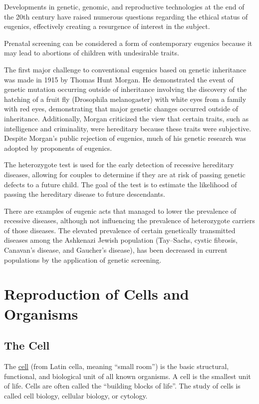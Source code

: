 Developments in genetic, genomic, and reproductive technologies at the end of the 20th century have raised numerous questions regarding the ethical status of eugenics, effectively creating a resurgence of interest in the subject.

Prenatal screening can be considered a form of contemporary eugenics because it may lead to abortions of children with undesirable traits.

The first major challenge to conventional eugenics based on genetic inheritance was made in 1915 by Thomas Hunt Morgan. He demonstrated the event of genetic mutation occurring outside of inheritance involving the discovery of the hatching of a fruit fly (Drosophila melanogaster) with white eyes from a family with red eyes, demonstrating that major genetic changes occurred outside of inheritance. Additionally, Morgan criticized the view that certain traits, such as intelligence and criminality, were hereditary because these traits were subjective. Despite Morgan's public rejection of eugenics, much of his genetic research was adopted by proponents of eugenics.

The heterozygote test is used for the early detection of recessive hereditary diseases, allowing for couples to determine if they are at risk of passing genetic defects to a future child. The goal of the test is to estimate the likelihood of passing the hereditary disease to future descendants.

There are examples of eugenic acts that managed to lower the prevalence of recessive diseases, although not influencing the prevalence of heterozygote carriers of those diseases. The elevated prevalence of certain genetically transmitted diseases among the Ashkenazi Jewish population (Tay--Sachs, cystic fibrosis, Canavan's disease, and Gaucher's disease), has been decreased in current populations by the application of genetic screening.

\hypertarget{reproduction-of-cells-and-organisms}{%
\chapter{Reproduction of Cells and Organisms}\label{reproduction-of-cells-and-organisms}}

\hypertarget{the-cell}{%
\section{The Cell}\label{the-cell}}

The \href{https://en.wikipedia.org/wiki/Cell_(biology)}{cell} (from Latin cella, meaning ``small room'') is the basic structural, functional, and biological unit of all known organisms. A cell is the smallest unit of life. Cells are often called the ``building blocks of life''. The study of cells is called cell biology, cellular biology, or cytology.

